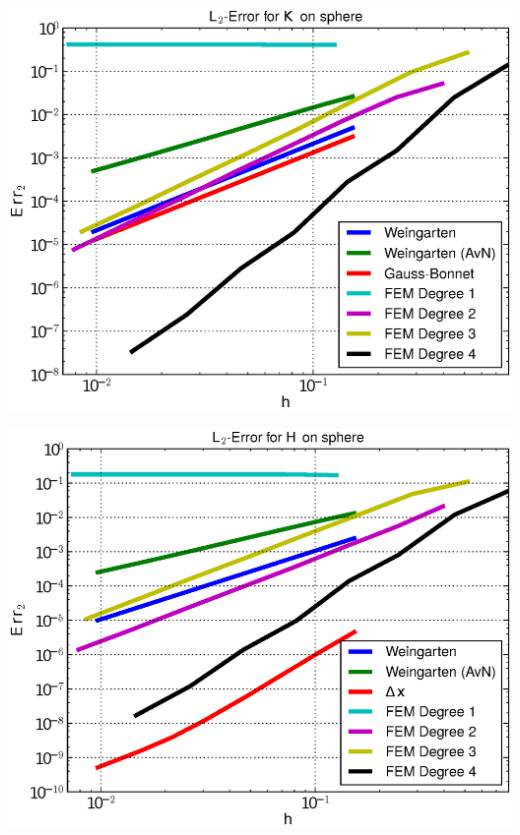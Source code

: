 \documentclass[handout]{beamer}
\begin{document}
\begin{frame}
\begin{overprint}
\begin{minipage}[t]{0.49\textwidth}
            \centering\includegraphics[width=\textwidth]{bilder/Curvature/sphere/ErrKL2_7.eps}
          \end{minipage}\hfill
          \begin{minipage}[t]{0.49\textwidth}
            \centering\includegraphics[width=\textwidth]{bilder/Curvature/sphere/ErrHL2_7.eps}
          \end{minipage}
           \begin{minipage}[t]{0.49\textwidth}

\end{minipage}
\end{overprint}
\end{frame}
\end{document}
